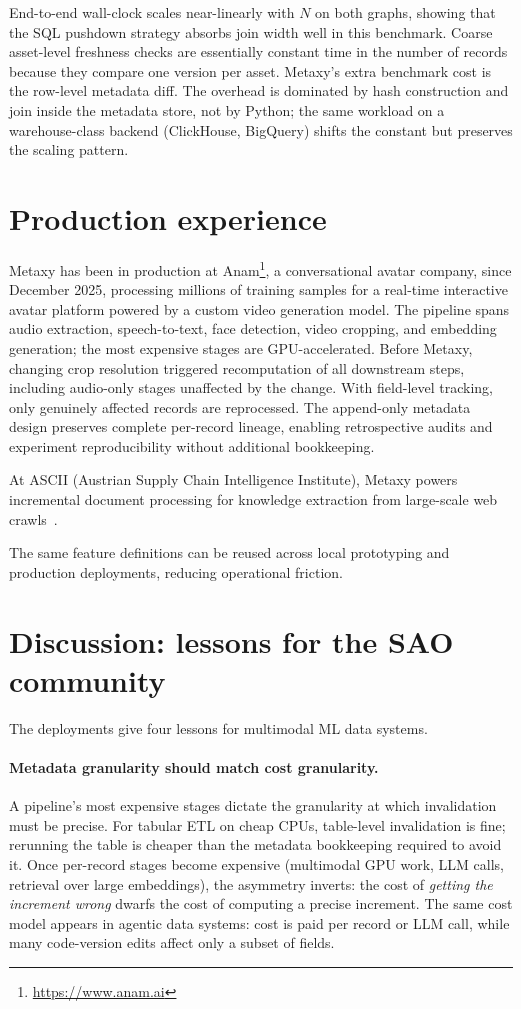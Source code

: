 \documentclass[sigconf]{acmart}
\begin{document}
End-to-end wall-clock scales near-linearly with $N$ on both graphs, showing that the SQL pushdown strategy absorbs join width well in this benchmark.
Coarse asset-level freshness checks are essentially constant time in the number of records because they compare one version per asset.
Metaxy's extra benchmark cost is the row-level metadata diff.
The overhead is dominated by hash construction and join inside the metadata store, not by Python; the same workload on a warehouse-class backend (ClickHouse, BigQuery) shifts the constant but preserves the scaling pattern.

\section{Production experience}

Metaxy has been in production at Anam\footnote{\url{https://www.anam.ai}}, a conversational avatar company, since December 2025, processing millions of training samples for a real-time interactive avatar platform powered by a custom video generation model.
The pipeline spans audio extraction, speech-to-text, face detection, video cropping, and embedding generation; the most expensive stages are GPU-accelerated.
Before Metaxy, changing crop resolution triggered recomputation of all downstream steps, including audio-only stages unaffected by the change.
With field-level tracking, only genuinely affected records are reprocessed.
The append-only metadata design preserves complete per-record lineage, enabling retrospective audits and experiment reproducibility without additional bookkeeping.

At ASCII (Austrian Supply Chain Intelligence Institute), Metaxy powers incremental document processing for knowledge extraction from large-scale web crawls~\cite{dagsterslurm}.

The same feature definitions can be reused across local prototyping and production deployments, reducing operational friction.

\section{Discussion: lessons for the SAO community}
\label{sec:lessons}

The deployments give four lessons for multimodal ML data systems.

\paragraph{Metadata granularity should match cost granularity.}
A pipeline's most expensive stages dictate the granularity at which invalidation must be precise.
For tabular ETL on cheap CPUs, table-level invalidation is fine; rerunning the table is cheaper than the metadata bookkeeping required to avoid it.
Once per-record stages become expensive (multimodal GPU work, LLM calls, retrieval over large embeddings), the asymmetry inverts: the cost of \emph{getting the increment wrong} dwarfs the cost of computing a precise increment.
The same cost model appears in agentic data systems: cost is paid per record or LLM call, while many code-version edits affect only a subset of fields.
\end{document}
